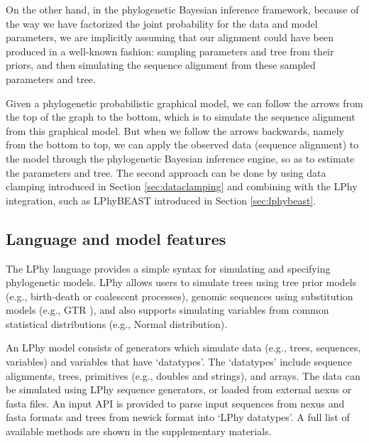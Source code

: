 \documentclass[10pt,letterpaper,table]{article}
\begin{document}
On the other hand, in the phylogenetic Bayesian inference framework, because of the way we have factorized the joint probability for the data and model parameters, we are implicitly assuming that our alignment could have been produced in a well-known fashion: sampling parameters and tree from their priors, and then simulating the sequence alignment from these sampled parameters and tree. 

Given a phylogenetic probabilistic graphical model, we can follow the arrows from the top of the graph to the bottom, which is to simulate the sequence alignment from this graphical model. But when we follow the arrows backwards, namely from the bottom to top, we can apply the observed data (sequence alignment) to the model through the phylogenetic Bayesian inference engine, so as to estimate the parameters and tree\cite{hohna2014probabilistic}. 
The second approach can be done by using data clamping introduced in Section \ref{sec:dataclamping} and combining with the LPhy integration, such as LPhyBEAST introduced in Section \ref{sec:lphybeast}.


\subsection{Language and model features}
The LPhy language provides a simple syntax for simulating and specifying phylogenetic models.
LPhy allows users to simulate trees using tree prior models (e.g., birth-death or coalescent processes), genomic sequences using substitution models (e.g., GTR \cite{gtr}), and also supports simulating variables from common statistical distributions (e.g., Normal distribution). 

An LPhy model consists of generators which simulate data (e.g., trees, sequences, variables) and variables that have `datatypes'. 
The `datatypes' include sequence alignments, trees, primitives (e.g., doubles and strings), and arrays. 
The data can be simulated using LPhy sequence generators, or loaded from external nexus or fasta files. 
An input API is provided to parse input sequences from nexus and fasta formats and trees from newick format into `LPhy datatypes'. 
A full list of available methods are shown in the supplementary materials.


\end{document}
